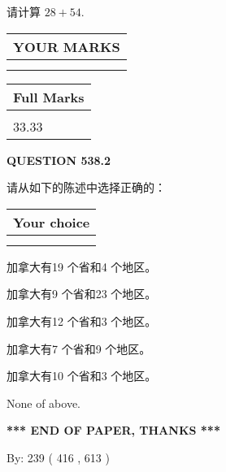 \documentclass{ctexart}
\begin{document}
  
 
请计算 $ %
28 +  %
54 $.
 

 

 
  
\vspace{0.2in}
  
\noindent\begin{tabular}{|l|}
\hline
 YOUR MARKS  \\
\hline
 \\ 
 \\ 
\hline
\end{tabular}
\hspace{0.05in} \begin{tabular}{|l|}
\hline
 Full Marks  \\
\hline
 \\ 
33.33 \\
\hline
\end{tabular}
{\textbf{\Large{QUESTION
538.2 
}}}
  
  
请从如下的陈述中选择正确的：
  
  
\noindent\hspace{3.0in} \begin{tabular}{|l|}
\hline
Your choice \\
\hline
 \\ 
 \\ 
\hline
\end{tabular}
  
  
 
 
加拿大有19 个省和4 个地区。
 
 
加拿大有9 个省和23 个地区。
 
 
加拿大有12 个省和3 个地区。
 
 
加拿大有7 个省和9 个地区。
 
 
加拿大有10 个省和3 个地区。
 
 
 None of above.
 
 
   
   
 \vspace{0.2in}
 
   
   
   
   
\vspace{1.0in} 
{\textbf{\large{ *** END OF PAPER, THANKS *** }}} 
   
   
\hspace{1.0in} By: 
 239 ( 416 ,  613 )
   
\end{document}
